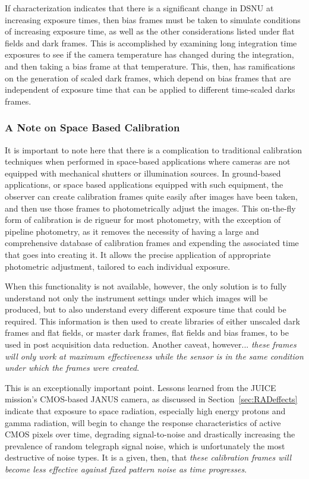 \documentclass[10pt]{article}
\begin{document}
If characterization indicates that there is a significant change in DSNU at increasing exposure times, then bias frames must be taken to simulate conditions of increasing exposure time, as well as the other considerations listed under flat fields and dark frames. This is accomplished by examining long integration time exposures to see if the camera temperature has changed during the integration, and then taking a bias frame at that temperature. This, then, has ramifications on the generation of scaled dark frames, which depend on bias frames that are independent of exposure time that can be applied to different time-scaled darks frames. 

\subsubsection{A Note on Space Based Calibration}
\label{sec:SBCalibration}

It is important to note here that there is a complication to traditional calibration techniques when performed in space-based applications where cameras are not equipped with mechanical shutters or illumination sources. In ground-based applications, or space based applications equipped with such equipment, the observer can create calibration frames quite easily after images have been taken, and then use those frames to photometrically adjust the images. This on-the-fly form of calibration is de rigueur for most photometry, with the exception of pipeline photometry, as it removes the necessity of having a large and comprehensive database of calibration frames and expending the associated time that goes into creating it. It allows the precise application of appropriate photometric adjustment, tailored to each individual exposure. 

When this functionality is not available, however, the only solution is to fully understand not only the instrument settings under which images will be produced, but to also understand every different exposure time that could be required. This information is then used to create libraries of either unscaled dark frames and flat fields, or master dark frames, flat fields and bias frames, to be used in post acquisition data reduction. Another caveat, however... \emph{these frames will only work at maximum effectiveness while the sensor is in the same condition under which the frames were created}. 

This is an exceptionally important point. Lessons learned from the JUICE mission's CMOS-based JANUS camera, as discussed in Section~\ref{sec:RADeffects} indicate that exposure to space radiation, especially high energy protons and gamma radiation,  will begin to change the response characteristics of active CMOS pixels over time, degrading signal-to-noise and drastically increasing the prevalence of random telegraph signal noise, which is unfortunately the most destructive of noise types. It is a given, then, that \emph{these calibration frames will become less effective against fixed pattern noise as time progresses}. 
\end{document}
